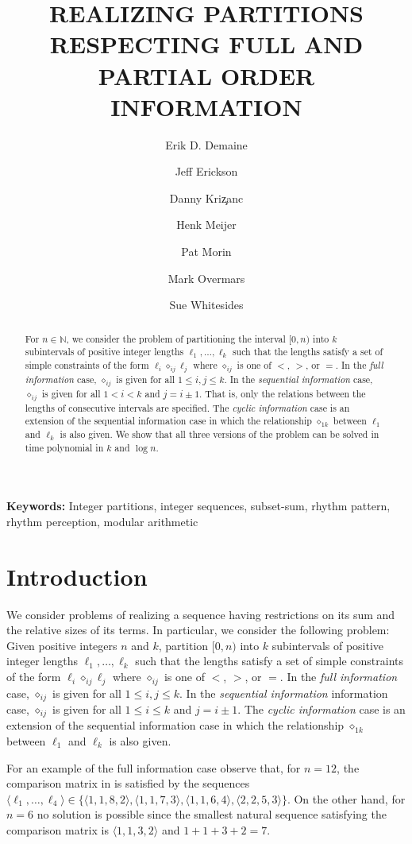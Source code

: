 \documentclass[11pt]{patmorin}
\title{\MakeUppercase{Realizing Partitions Respecting Full 
	and Partial Order Information}}
\author{
	Erik D. Demaine \and
	Jeff Erickson \and
	Danny Kri\c{z}anc \and
	Henk Meijer \and
	Pat Morin \and
	Mark Overmars \and
	Sue Whitesides
}
\date{}
\newcommand{\N}{\mathbb{N}}
\newcommand{\op}{\diamond}
\newcommand{\opij}{\op_{ij}}
\begin{document}
\maketitle
\thispagestyle{empty}

\begin{abstract} 
For $n\in\N$, we consider the problem of partitioning the interval
$[0,n)$ into $k$ subintervals of positive integer lengths
$\ell_1,\ldots,\ell_k$ such that the lengths satisfy a set of simple
constraints of the form $\ell_i \opij \ell_j$ where $\opij$ is one of
$<$, $>$, or $=$.  In the \emph{full information} case, $\opij$ is
given for all $1\le i,j\le k$.  In the \emph{sequential information}
case, $\opij$ is given for all $1< i< k$ and $j=i\pm 1$.
That is, only the relations between the lengths of consecutive
intervals are specified.  The \emph{cyclic information} case is an
extension of the sequential information case in which the 
relationship $\op_{1k}$ between $\ell_1$ and $\ell_k$ is also given.
We show that all three versions of the problem can be solved in time
polynomial in $k$ and $\log n$.
\end{abstract}

\noindent\textbf{Keywords:} Integer partitions, integer sequences,
subset-sum, rhythm pattern, rhythm perception, modular arithmetic

\section{Introduction}
We consider problems of realizing a sequence having restrictions on
its sum and the relative sizes of its terms.  In particular, we
consider the following problem:  Given positive integers $n$ and $k$,
partition $[0,n)$ into $k$ subintervals of positive integer lengths
$\ell_1,\ldots,\ell_k$ such that the lengths satisfy a set of simple
constraints of the form $\ell_i \opij \ell_j$ where $\opij$ is one of
$<$, $>$, or $=$.  In the \emph{full information} case, $\opij$ is
given for all $1\le i,j\le k$.  In the \emph{sequential information}
information case, $\opij$ is given for all $1\le i\le k$ and $j=i\pm
1$.  The \emph{cyclic information} case is an extension of the
sequential information case in which the relationship $\op_{1k}$
between $\ell_1$ and $\ell_k$ is also given. 

For an example of the full information case observe that, for $n=12$,
the comparison matrix in  is satisfied by the
sequences $\langle\ell_1,\ldots,\ell_4\rangle\in
\{\langle1,1,8,2\rangle, \langle1,1,7,3\rangle, \langle1,1,6,4\rangle,
\langle2,2,5,3\rangle\}$.  On the other hand, for $n=6$ no solution is
possible since the smallest natural sequence satisfying the comparison
matrix is $\langle1,1,3,2\rangle$ and $1+1+3+2=7$.
\end{document}
